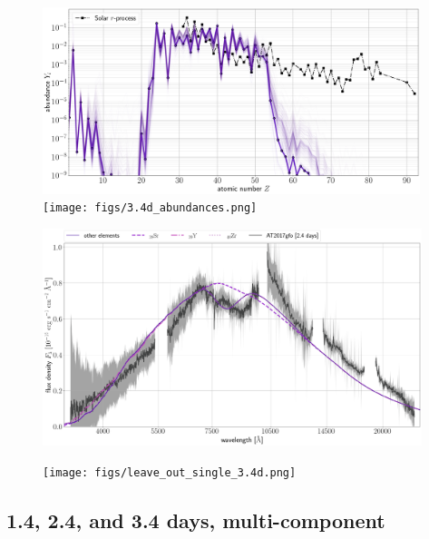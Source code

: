 \documentclass[twocolumn, twocolappendix]{aastex63}
\begin{document}
\begin{figure}[!ht]
    \includegraphics[width=0.98\textwidth]{figs/W18_abunds_sampleposterior_2.42d_Z1-92_Ye_0.306__vexp_0.172__s_17.3__solarL09B14_500samples.png}
    \texttt{[image: figs/3.4d\_abundances.png]}
    \label{fig:infer_abunds_single}
\end{figure}


\begin{figure}[!ht]
    \includegraphics[width=0.985\textwidth]{figs/230409_234104_leaveoneout_all_TARDIS_evals_label-interest.png}
    \label{fig:leave_out_single_2.4d}
\end{figure}

\begin{figure}[!ht]
    \texttt{[image: figs/leave\_out\_single\_3.4d.png]}
    \label{fig:leave_out_single_3.4d}
\end{figure}



\subsection{1.4, 2.4, and 3.4 days, multi-component} 
\end{document}
